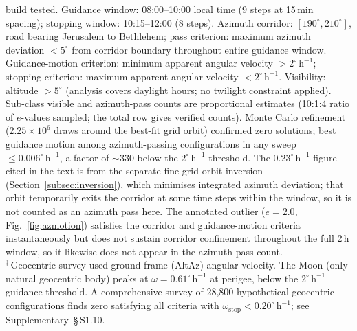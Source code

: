 \documentclass[sn-nature]{sn-jnl}
\begin{document}
\begin{table}[h]
{build tested.
Guidance window: 08:00--10:00 local time (9 steps at
15\,min spacing); stopping window: 10:15--12:00 (8 steps).
Azimuth corridor: $[190^\circ, 210^\circ]$, road bearing Jerusalem to
Bethlehem; pass criterion: maximum azimuth deviation $<\!5^\circ$ from
corridor boundary throughout entire guidance window.
Guidance-motion criterion: minimum apparent angular velocity
$> 2^\circ\,\mathrm{h}^{-1}$; stopping criterion:
maximum apparent angular velocity $< 2^\circ\,\mathrm{h}^{-1}$.
Visibility: altitude $> 5^\circ$ (analysis covers daylight hours; no twilight constraint applied).
Sub-class visible and azimuth-pass counts are proportional estimates
(10:1:4 ratio of $e$-values sampled; the total row gives verified counts).
Monte Carlo refinement ($2.25\times10^6$ draws around the best-fit grid
orbit) confirmed zero solutions; best guidance motion among
azimuth-passing configurations in any sweep $\leq 0.006^\circ\,\mathrm{h}^{-1}$,
a factor of ${\sim}330$ below the $2^\circ\,\mathrm{h}^{-1}$ threshold.
The $0.23^\circ\,\mathrm{h}^{-1}$ figure cited in the text is from the
separate fine-grid orbit inversion (Section~\ref{subsec:inversion}), which
minimises integrated azimuth deviation; that orbit temporarily exits the
corridor at some time steps within the window, so it is not counted as an
azimuth pass here.
The annotated outlier ($e=2.0$, Fig.~\ref{fig:azmotion}) satisfies the
corridor and guidance-motion criteria instantaneously but does not sustain
corridor confinement throughout the full 2\,h window, so it likewise does not
appear in the azimuth-pass count.\\
$^\dagger$\,Geocentric survey used ground-frame (AltAz) angular velocity.
The Moon (only natural geocentric body) peaks at $\omega = 0.61^\circ\,\mathrm{h}^{-1}$
at perigee, below the $2^\circ\,\mathrm{h}^{-1}$ guidance threshold.
A comprehensive survey of 28,800 hypothetical geocentric configurations finds
zero satisfying all criteria with $\omega_\mathrm{stop} < 0.20^\circ\,\mathrm{h}^{-1}$;
see Supplementary~\S\,S1.10.}
\end{table}
\end{document}
